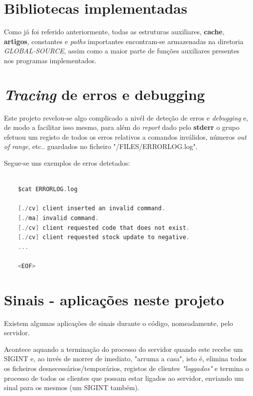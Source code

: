\documentclass[a4paper,11pt]{report}
\begin{document}
\section{Bibliotecas implementadas}

\hspace{0.50cm} Como já foi referido anteriormente, todas as estruturas auxiliares, \textbf{cache}, \textbf{artigos}, constantes e \textit{paths} importantes encontram-se armazenadas na diretoria \textit{GLOBAL-SOURCE}, assim como a maior parte de funções auxiliares presentes nos programas implementados.

\section{\textit{Tracing} de erros e debugging}

\hspace{0.50cm} Este projeto revelou-se algo complicado a nivél de deteção de erros e \textit{debugging} e, de modo a facilitar isso mesmo, para além do \textit{report} dado pelo \textbf{stderr} o grupo efetuou um registo de todos os erros relativos a comandos inválidos, números \textit{out of range}, etc.. guardados no ficheiro "/FILES/ERRORLOG.log".

Segue-se uns exemplos de erros detetados:

\begin{lstlisting}[language=C]

    $cat ERRORLOG.log

    [./cv] client inserted an invalid command.
    [./ma] invalid command.
    [./cv] client requested code that does not exist.
    [./cv] client requested stock update to negative.
    ...
    
    <EOF>

\end{lstlisting}

\section{Sinais - aplicações neste projeto}

\hspace{0.5cm} Existem algumas aplicações de sinais durante o código, nomeadamente, pelo servidor. 

Acontece aquando a terminação do processo do servidor quando este recebe um SIGINT e, ao invés de morrer de imediato, "arruma a casa", isto é, elimina todos os ficheiros desnecessários/temporários, registos de clientes \textit{"loggados"} e termina o processo de todos os clientes que possam estar ligados ao servidor, enviando um sinal para os mesmos (um SIGINT também).
\end{document}
